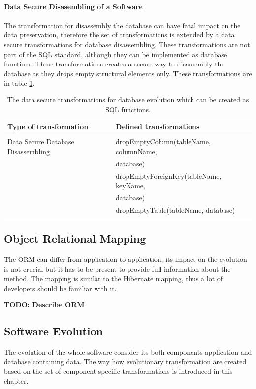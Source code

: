\documentclass[runningheads]{comsis}
\begin{document}
\paragraph{Data Secure Disasembling of a Software} The transformation for disassembly the database can have fatal impact on the data preservation, therefore the set of transformations is extended by a data secure transformations for database disassembling. These transformations are not part of the SQL standard, although they can be implemented as database functions. These transformations creates a secure way to disassembly the database as they drops empty structural elements only. These transformations are in table \ref{tab:db-adv-evolution}. 
\begin{table}
\centering
\caption{The data secure transformations for database evolution which can be created as SQL functions.}
	\label{tab:db-adv-evolution}
	\begin{tabular}{ll}
	\hline
	Type of transformation & Defined transformations \\
	\hline
	\\[-2ex] 
	Data Secure Database Disassembling &
	dropEmptyColumn(tableName, columnName, \\ & \hspace{0.25in} database) \\
	& dropEmptyForeignKey(tableName, keyName, \\ & \hspace{0.25in} database) \\
	& dropEmptyTable(tableName, database) \\
	\hline
	\end{tabular}
\end{table} 



\subsection{Object Relational Mapping}
The ORM can differ from application to application, its impact on the evolution is not crucial but it has to be present to provide full information about the method. The mapping is similar to the Hibernate
mapping, thus a lot of developers should be familiar with it. 

\textbf{TODO: Describe ORM}

\subsection{Software Evolution}
\label{sec:sw-evolution}
The evolution of the whole software consider its both components application and database containing data. The way how evolutionary transformation are created based on the set of component specific transformations is introduced in this chapter.
\end{document}
